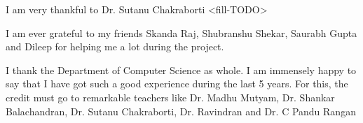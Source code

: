 \acknowledgements

I am very thankful to Dr. Sutanu Chakraborti <fill-TODO>

I am ever grateful to my friends Skanda Raj, Shubranshu Shekar, Saurabh Gupta and Dileep for helping me a lot during the project.

I thank the Department of Computer Science as
whole. I am immensely happy to say that I have got such a good experience during the last 5 years. For this, the credit must go to remarkable
teachers like  Dr. Madhu Mutyam, Dr. Shankar Balachandran, Dr.
Sutanu Chakraborti, Dr. Ravindran and Dr. C Pandu Rangan

